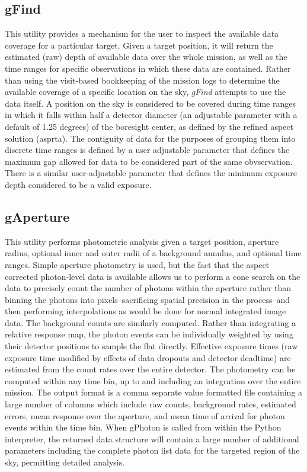\documentclass[preprint]{aastex}
\begin{document}
\subsection{gFind}
This utility provides a mechanism for the user to inspect the available data coverage for a particular target. Given a target position, it will return the estimated (raw) depth of available data over the whole mission, as well as the time ranges for specific observations in which these data are contained. Rather than using the visit-based bookkeeping of the mission logs to determine the available coverage of a specific location on the sky, \textit{gFind} attempts to use the data itself. A position on the sky is considered to be covered during time ranges in which it falls within half a detector diameter (an adjustable parameter with a default of 1.25 degrees) of the boresight center, as defined by the refined aspect solution (asprta). The contiguity of data for the purposes of grouping them into discrete time ranges is defined by a user adjustable parameter that defines the maximum gap allowed for data to be considered part of the same obvservation. There is a similar user-adjustable parameter that defines the minimum exposure depth considered to be a valid exposure.

\subsection{gAperture}
This utility performs photometric analysis given a target position, aperture radius, optional inner and outer radii of a background annulus, and optional time ranges. Simple aperture photometry is used, but the fact that the aspect corrected photon-level data is available allows us to perform a cone search on the data to precisely count the number of photons within the aperture rather than binning the photons into pixels--sacrificing spatial precision in the process--and then performing interpolations as would be done for normal integrated image data. The background counts are similarly computed. Rather than integrating a relative response map, the photon events can be individually weighted by using their detector positions to sample the flat directly. Effective exposure times (raw exposure time modified by effects of data dropouts and detector deadtime) are estimated from the count rates over the entire detector. The photometry can be computed within any time bin, up to and including an integration over the entire mission. The output format is a comma separate value formatted file containing a large number of columns which include raw counts, background rates, estimated errors, mean response over the aperture, and mean time of arrival for photon events within the time bin. When gPhoton is called from within the Python interpreter, the returned data structure will contain a large number of additional parameters including the complete photon list data for the targeted region of the sky, permitting detailed analysis.
\end{document}
